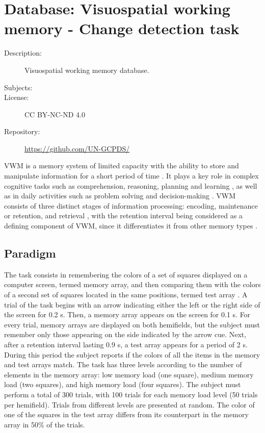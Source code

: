 \chapter{Database: Visuospatial working memory - Change detection task}\label{appendix:working_memory}

\begin{description}
   \item[Description:]      Visuospatial working memory database.
   \item[Subjects:]         
   \item[License:]          CC BY-NC-ND 4.0
   \item[Repository:]       \url{https://github.com/UN-GCPDS/}
\end{description}
\hrulefill

\gls*{VWM} is a memory system of limited capacity with the ability to store and manipulate information for a short period of time \cite{baddeley2017working, pavlov2022oscillatory}. It plays a key role in complex cognitive tasks such as comprehension, reasoning, planning and learning \cite{johnson2019spectral, zhang2016functional}, as well as in daily activities such as problem solving and decision-making \cite{dai2017eeg}. \gls{VWM} consists of three distinct stages of information processing: encoding, maintenance or retention, and retrieval \cite{johnson2018dynamic}, with the retention interval being considered as a defining component of \gls{VWM}, since it differentiates it from other memory types \cite{pavlov2022oscillatory}. 

\section{Paradigm}
The task consists in remembering the colors of a set of squares displayed on a computer screen, termed memory array, and then comparing them with the colors of a second set of squares located in the same positions, termed test array \cite{vogel2004neural}. A trial of the task begins with an arrow indicating either the left or the right side of the screen for 0.2 s. Then, a memory array appears on the screen for 0.1 s. For every trial, memory arrays are displayed on both hemifields, but the subject must remember only those appearing on the side indicated by the arrow cue. Next, after a retention interval lasting 0.9 s, a test array appears for a period of 2 s. During this period the subject reports if the colors of all the items in the memory and test arrays match. The task has three levels according to the number of elements in the memory array: low memory load (one square), medium memory load (two squares), and high memory load (four squares). The subject must perform a total of 300 trials, with 100 trials for each memory load level (50 trials per hemifield). Trials from different levels are presented at random. The color of one of the squares in the test array differs from its counterpart in the memory array in 50\% of the trials.


